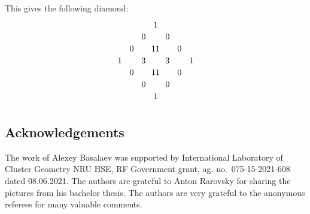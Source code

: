 \documentclass[10pt,a4paper]{article}
\numberwithin{equation}{section}
\begin{document}
\begin{Example}
This gives the following diamond:
\[
 \begin{tikzpicture}
 \begin{scope}[x={(-0.50cm,-.50cm)},y={(0.50cm,-.50cm)}]
 \draw (0,0) node {1};
 \draw (1,0) node {0};
 \draw (0,1) node {0};
 \draw (2,2) node {11};
 \draw (2,0) node {0};
 \draw (0,2) node {0};
 \draw (1,2) node {3};
 \draw (2,1) node {3};
 \draw (1,1) node {11};
 \draw (3,0) node {1};
 \draw (0,3) node {1};
 \draw (3,1) node {0};
 \draw (1,3) node {0};
 \draw (3,2) node {0};
 \draw (2,3) node {0};
 \draw (3,3) node {1};
 \end{scope}
\end{tikzpicture}
\]
\end{Example}


\subsection*{Acknowledgements}
The work of Alexey Basalaev was supported by International Laboratory of Cluster Geometry NRU HSE, RF Government grant, ag. no.~075-15-2021-608 dated 08.06.2021.
The authors are grateful to Anton Rarovsky for sharing the pictures from his bachelor thesis.
The authors are very grateful to the anonymous referees for many valuable comments.
\end{document}
